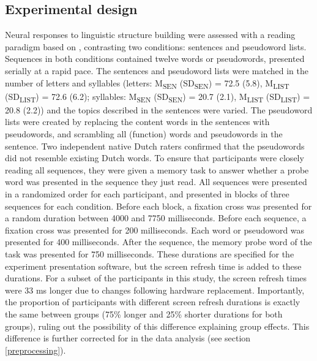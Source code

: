 \subsection{Experimental design}
Neural responses to linguistic structure building were assessed with a reading paradigm based on \cite{fedorenko2010}, contrasting two conditions: sentences and pseudoword lists. Sequences in both conditions contained twelve words or pseudowords, presented serially at a rapid pace. The sentences and pseudoword lists were matched in the number of letters and syllables (letters: M\textsubscript{SEN} (SD\textsubscript{SEN}) = 72.5 (5.8), M\textsubscript{LIST} (SD\textsubscript{LIST}) = 72.6 (6.2); syllables: M\textsubscript{SEN} (SD\textsubscript{SEN}) = 20.7 (2.1), M\textsubscript{LIST} (SD\textsubscript{LIST}) = 20.8 (2.2)) and the topics described in the sentences were varied. The pseudoword lists were created by replacing the content words in the sentences with pseudowords, and scrambling all (function) words and pseudowords in the sentence. Two independent native Dutch raters confirmed that the pseudowords did not resemble existing Dutch words. To ensure that participants were closely reading all sequences, they were given a memory task to answer whether a probe word was presented in the sequence they just read. All sequences were presented in a randomized order for each participant, and presented in blocks of three sequences for each condition. Before each block, a fixation cross was presented for a random duration between 4000 and 7750 milliseconds. Before each sequence, a fixation cross was presented for 200 milliseconds. Each word or pseudoword was presented for 400 milliseconds. After the sequence, the memory probe word of the task was presented for 750 milliseconds. These durations are specified for the experiment presentation software, but the screen refresh time is added to these durations. For a subset of the participants in this study, the screen refresh times were 33 ms longer due to changes following hardware replacement. Importantly, the proportion of participants with different screen refresh durations is exactly the same between groups (75\% longer and 25\% shorter durations for both groups), ruling out the possibility of this difference explaining group effects. This difference is further corrected for in the data analysis (see section \ref{preprocessing}). 


